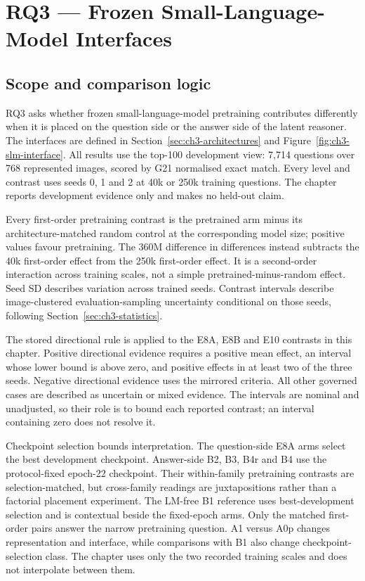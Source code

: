 \chapter{RQ3 — Frozen Small-Language-Model Interfaces}

\section{Scope and comparison logic}
\label{sec:ch6-scope}
RQ3 asks whether frozen small-language-model pretraining contributes differently
when it is placed on the question side or the answer side of the latent
reasoner. The interfaces are defined in Section~\ref{sec:ch3-architectures}
and Figure~\ref{fig:ch3-slm-interface}. All results use the top-100 development
view: 7,714 questions over 768 represented images, scored by G21 normalised
exact match. Every level and contrast uses seeds 0, 1 and 2 at 40k or 250k
training questions. The chapter reports development evidence only and makes no
held-out claim.

Every first-order pretraining contrast is the pretrained arm minus its
architecture-matched random control at the corresponding model size; positive
values favour pretraining. The 360M difference in differences instead
subtracts the 40k first-order effect from the 250k first-order effect. It is a
second-order interaction across training scales, not a simple
pretrained-minus-random effect. Seed SD describes variation across trained
seeds. Contrast intervals describe image-clustered evaluation-sampling
uncertainty conditional on those seeds, following
Section~\ref{sec:ch3-statistics}.

The stored directional rule is applied to the E8A, E8B and E10 contrasts in
this chapter. Positive directional evidence requires a positive mean effect,
an interval whose lower bound is above zero, and positive effects in at least
two of the three seeds. Negative directional evidence uses the mirrored
criteria. All other governed cases are described as uncertain or mixed
evidence. The intervals are nominal and unadjusted, so their role is to bound
each reported contrast; an interval containing zero does not resolve it.

Checkpoint selection bounds interpretation. The question-side E8A arms select the best development checkpoint. Answer-side B2, B3, B4r and B4 use the
protocol-fixed epoch-22 checkpoint. Their within-family pretraining contrasts
are selection-matched, but cross-family readings are juxtapositions rather than
a factorial placement experiment. The LM-free B1 reference uses
best-development selection and is contextual beside the fixed-epoch arms.
Only the matched first-order pairs answer the narrow pretraining question.
A1 versus A0p changes representation and interface, while comparisons with B1
also change checkpoint-selection class. The chapter uses only the two recorded
training scales and does not interpolate between them.

